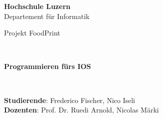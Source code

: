 \documentclass[12pt,titlepage]{article}
\begin{document}
\thispagestyle{empty}

\begin{center}
\textbf{Hochschule Luzern}\\
Departement für Informatik\\[12\baselineskip]

\begin{Huge}
Projekt FoodPrint
\end{Huge} \\[6\baselineskip]

\begin{large}
\textbf{Programmieren fürs IOS}
\end{large} \\[6\baselineskip]

\begin{large}
\textbf{Studierende}: Frederico Fischer, Nico Iseli\\
\textbf{Dozenten}: Prof. Dr. Ruedi Arnold, Nicolas Märki\


\end{large}
\end{center}
\end{document}
